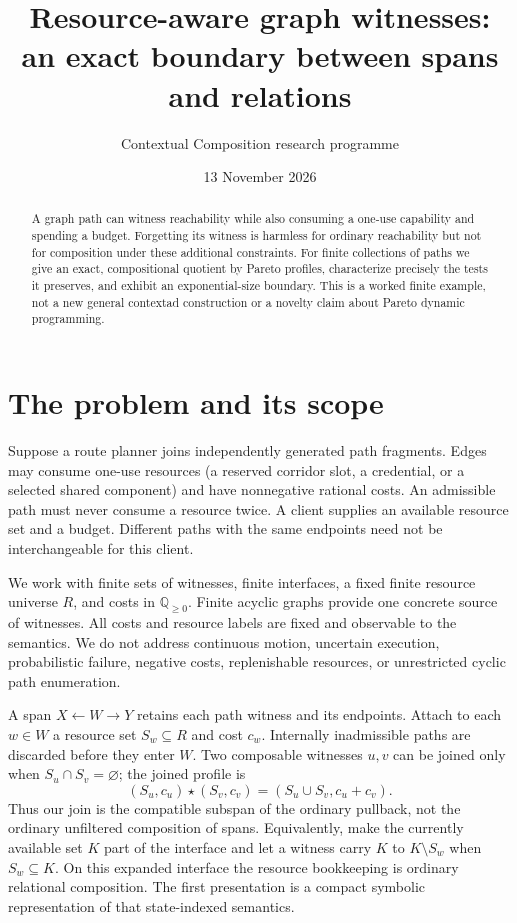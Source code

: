 \documentclass[11pt]{article}
\title{Resource-aware graph witnesses: an exact boundary between spans and relations}
\author{Contextual Composition research programme}
\date{13 November 2026}
\begin{document}
\maketitle
\begin{abstract}
A graph path can witness reachability while also consuming a one-use capability and spending a budget. Forgetting its witness is harmless for ordinary reachability but not for composition under these additional constraints. For finite collections of paths we give an exact, compositional quotient by Pareto profiles, characterize precisely the tests it preserves, and exhibit an exponential-size boundary. This is a worked finite example, not a new general contextad construction or a novelty claim about Pareto dynamic programming.
\end{abstract}
\section{The problem and its scope}
Suppose a route planner joins independently generated path fragments. Edges may consume one-use resources (a reserved corridor slot, a credential, or a selected shared component) and have nonnegative rational costs. An admissible path must never consume a resource twice. A client supplies an available resource set and a budget. Different paths with the same endpoints need not be interchangeable for this client.

We work with finite sets of witnesses, finite interfaces, a fixed finite resource universe $R$, and costs in $\mathbb Q_{\geq0}$. Finite acyclic graphs provide one concrete source of witnesses. All costs and resource labels are fixed and observable to the semantics. We do not address continuous motion, uncertain execution, probabilistic failure, negative costs, replenishable resources, or unrestricted cyclic path enumeration.

A span $X\leftarrow W\rightarrow Y$ retains each path witness and its endpoints. Attach to each $w\in W$ a resource set $S_w\subseteq R$ and cost $c_w$. Internally inadmissible paths are discarded before they enter $W$. Two composable witnesses $u,v$ can be joined only when $S_u\cap S_v=\varnothing$; the joined profile is
\[
 (S_u,c_u)\star(S_v,c_v)=(S_u\cup S_v,c_u+c_v).
\]
Thus our join is the compatible subspan of the ordinary pullback, not the ordinary unfiltered composition of spans. Equivalently, make the currently available set $K$ part of the interface and let a witness carry $K$ to $K\setminus S_w$ when $S_w\subseteq K$. On this expanded interface the resource bookkeeping is ordinary relational composition. The first presentation is a compact symbolic representation of that state-indexed semantics.
\end{document}
